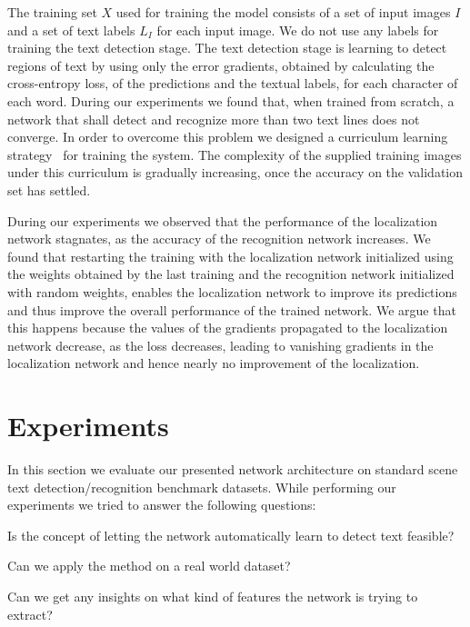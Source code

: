 \documentclass[letterpaper]{article}
\begin{document}
	The training set $X$ used for training the model consists of a set of input images $I$ and a set of text labels $L_I$ for each input image.
	We do not use any labels for training the text detection stage.
	The text detection stage is learning to detect regions of text by using only the error gradients, obtained by calculating the cross-entropy loss, of the predictions and the textual labels, for each character of each word.
	During our experiments we found that, when trained from scratch, a network that shall detect and recognize more than two text lines does not converge.
	In order to overcome this problem we designed a curriculum learning strategy~\cite{Bengio2009Curriculum} for training the system.
	The complexity of the supplied training images under this curriculum is gradually increasing, once the accuracy on the validation set has settled.

	During our experiments we observed that the performance of the localization network stagnates, as the accuracy of the recognition network increases.
	We found that restarting the training with the localization network initialized using the weights obtained by the last training and the recognition network initialized with random weights, enables the localization network to improve its predictions and thus improve the overall performance of the trained network.
	We argue that this happens because the values of the gradients propagated to the localization network decrease, as the loss decreases, leading to vanishing gradients in the localization network and hence nearly no improvement of the localization.

	\section{Experiments}
	\label{sec:experiments}

	In this section we evaluate our presented network architecture on standard scene text detection/recognition benchmark datasets.
	While performing our experiments we tried to answer the following questions:
	\begin{enumerate*}[label={(\arabic*)}]
		\item Is the concept of letting the network automatically learn to detect text feasible?
		\item Can we apply the method on a real world dataset?
		\item Can we get any insights on what kind of features the network is trying to extract?
	\end{enumerate*}
\end{document}
